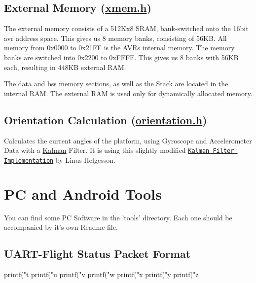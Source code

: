 \subsection*{External Memory (\hyperlink{xmem_8h}{xmem.\-h})}

The external memory consists of a 512\-Kx8 S\-R\-A\-M, bank-\/switched onto the 16bit avr address space. This gives us 8 memory banks, consisting of 56\-K\-B. All memory from 0x0000 to 0x21\-F\-F is the A\-V\-Rs internal memory. The memory banks are switched into 0x2200 to 0x\-F\-F\-F\-F. This gives us 8 banks with 56\-K\-B each, resulting in 448\-K\-B external R\-A\-M.

The data and bss memory sections, as well as the Stack are located in the internal R\-A\-M. The external R\-A\-M is used only for dynamically allocated memory.

\subsection*{Orientation Calculation (\hyperlink{orientation_8h}{orientation.\-h})}

Calculates the current angles of the platform, using Gyroscope and Accelerometer Data with a \hyperlink{struct_kalman}{Kalman} Filter. It is using this slightly modified \href{http://www.linushelgesson.se/2012/04/pitch-and-roll-estimating-kalman-filter-for-stabilizing-quadrocopters/}{\tt Kalman Filter Implementation} by Linus Helgesson.

\section*{P\-C and Android Tools}

You can find some P\-C Software in the 'tools' directory. Each one should be accompanied by it's own Readme file.

\subsection*{U\-A\-R\-T-\/\-Flight Status Packet Format}

\begin{DoxyVerb}printf("t%
printf("u%
printf("v%
printf("w%
printf("x%
printf("y%
printf("z%
\end{DoxyVerb}


